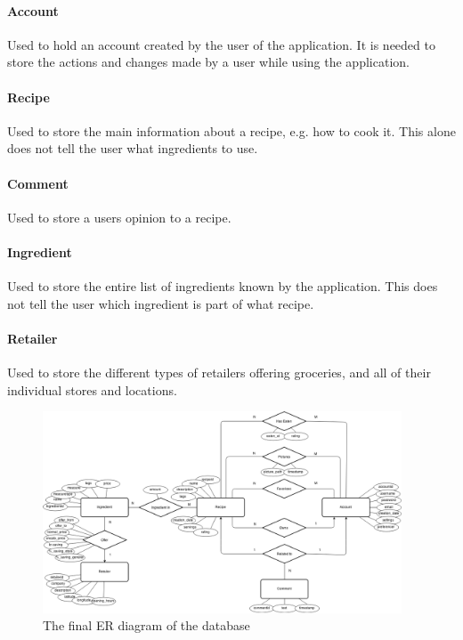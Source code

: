 \paragraph{Account} Used to hold an account created by the user of the application. It is needed to store the actions and changes made by a user while using the application. 

\paragraph{Recipe} Used to store the main information about a recipe, e.g. how to cook it. This alone does not tell the user what ingredients to use.

\paragraph{Comment} Used to store a users opinion to a recipe.

\paragraph{Ingredient} Used to store the entire list of ingredients known by the application. This does not tell the user which ingredient is part of what recipe.

\paragraph{Retailer} Used to store the different types of retailers offering groceries, and all of their individual stores and locations.
\newline

\begin{figure}
\label{fig:ER-diagram}
\centering
\includegraphics[width=0.95\textwidth]{Pictures/ERdiagram}
\caption{The final ER diagram of the database}
\end{figure}


